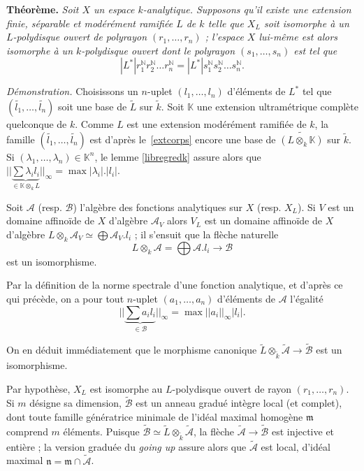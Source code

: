 \documentclass[10pt,leqno]{article}
\newcommand{\got}[1]{{\mathfrak #1}}
\renewcommand{\Bbb}{\mathbb}
\renewcommand{\cal}{\mathscr}
\newcommand{\KK}{{\Bbb K}}
\newcommand{\NN}{{\Bbb N}}
\newcommand{\red}{\widetilde}
\newcommand{\deux}[1]{\refstepcounter{subsection}\label{#1}\medskip\noindent {\bf (\thesubsection)}\hspace{.1cm}}
\begin{document}
\medskip
\deux{pseudo} {\bf Théorème.} {\em Soit $X$ un espace $k$-analytique. Supposons qu'il existe une extension finie, séparable et modérément ramifiée $L$ de $k$ telle que $X_{L}$ soit isomorphe à un $L$-polydisque ouvert de polyrayon $(r_1,\ldots,r_n)$ ; l'espace $X$ lui-même est alors isomorphe à un $k$-polydisque ouvert dont le polyrayon $(s_1,\ldots, s_n)$ est tel que $$|L^*|r_1^{\NN}r_2^{\NN}\ldots r_n ^{\NN}=|L^*|s_1^{\NN}s_2^{\NN}\ldots s_n ^{\NN}.$$ }

\medskip
{\em Démonstration.} Choisissons un $n$-uplet $(l_{1},\ldots,l_{n})$ d'éléments de $L^{*}$ tel que $(\red{l_{1}},\ldots,\red{l_{n}})$ soit une base de $\red{L}$ sur $\red{k}$. Soit $\KK$ une extension ultramétrique complète quelconque de $k$. Comme $L$ est une extension modérément ramifiée de $k$, la famille $(\red{l_{1}},\ldots,\red{l_{n}})$ est d'après le~\ref{extcorps} encore une base de $\red{(L\otimes_{k}\KK)}$ sur $\red{k}$. Si $(\lambda_{1},\ldots,\lambda_{n})\in \KK^{n}$, le lemme \ref{libregredk} assure alors que $||\underbrace{\sum \lambda_{i}l_{i}}_{\in \KK\otimes_{k}L}||_{\infty}=\max |\lambda_{i}|.|l_{i}|$.

\medskip
Soit $\cal A$ (resp. $\cal B$) l'algèbre des fonctions analytiques sur $X$ (resp. $X_L$). Si $V$ est un domaine affinoïde de $X$ d'algèbre ${\cal A}_V$ alors $V_L$ est un domaine affinoïde de $X$ d'algèbre $L\otimes_k{\cal A}_V\simeq \bigoplus {\cal A}_V.l_i$ ; il s'ensuit que la flèche naturelle $$L\otimes_k{\cal A}=\bigoplus {\cal A}.l_i\to \cal B$$ est un isomorphisme. 

Par la définition de la norme spectrale d'une fonction analytique, et d'après ce qui précède, on a pour tout $n$-uplet $(a_{1},\ldots,a_{n})$ d'éléments de ${\cal A}$ l'égalité $$||\underbrace{\sum a_{i}l_{i}}_{\in \cal B}||_{\infty}=\max ||a_{i}||_{\infty}|l_{i}|.$$

On en déduit immédiatement que le morphisme canonique $\red{L}\otimes_{\red{k}}\red{\cal A}\to \red{\cal B}$ est un isomorphisme. 

\medskip
Par hypothèse, $X_{L}$ est isomorphe au $L$-polydisque ouvert de rayon $(r_1,\ldots,r_n)$. Si $m$ désigne sa dimension, $\red{\cal B}$ est un anneau gradué intègre local (et complet), dont toute famille génératrice minimale de l'idéal maximal homogène $\got{m}$ comprend $m$ éléments. Puisque $\red{\cal B}\simeq \red{L}\otimes_{\red{k}}\red{\cal A}$, la flèche $\red{\cal A}\to \red{\cal B}$ est injective et entière ; la version graduée du {\em going up} assure alors que $\red{\cal A}$ est local, d'idéal maximal $\got{n}=\got{m}\cap \red{\cal A}$. 
\end{document}
